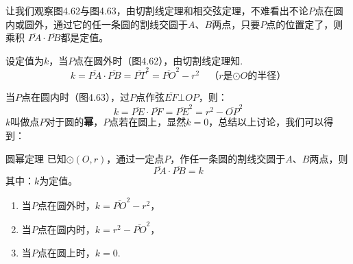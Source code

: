   \begin{figure}[htp]
    \centering
    \begin{minipage}[t]{0.48\textwidth}
    \centering
    \caption{}
    \end{minipage}
    \begin{minipage}[t]{0.48\textwidth}
    \centering
    \caption{}
    \end{minipage}
  \end{figure}
  
  让我们观察图4.62与图4.63，由切割线定理和相交弦定理，不难看出不论$P$点在圆内或圆外，通过它的任一条圆的割线交圆于$A$、$B$两点，只要$P$点的位置定了，则乘积
  $\overline{PA}\cdot \overline{PB}$都是定值。
  
  设定值为$k$，当$P$点在圆外时（图4.62），由切割线定理知.
  \[k=\overline{PA}\cdot \overline{PB}=\overline{PT}^2=\overline{PO}^2-r^2\quad \text{（$r$是$\odot O$的半径）}\]
  
  当$P$点在圆内时（图4.63），过$P$点作弦$\overline{EF}\bot OP$，则：
  \[k=\overline{PE}\cdot \overline{PF}=\overline{PE}^2=r^2-\overline{OP}^2\]
  $k$叫做点$P$对于圆的\textbf{幂}，$P$点若在圆上，显然$k=0$，总结以上讨论，我们可以得到：
  
  \begin{blk}
    {圆幂定理} 已知$\odot(O,r)$，通过一定点$P$，作任一条圆的割线交圆于$A$、$B$两点，则
   \[ \overline{PA}\cdot \overline{PB}=k\]
   其中：$k$为定值。
  \begin{enumerate}
  \item   当$P$点在圆外时，$k=\overline{PO}^2-r^2$，
  \item  当$P$点在圆内时，$k=r^2-\overline{PO}^2$，
  \item  当$P$点在圆上时，$k=0$.
  \end{enumerate}
  \end{blk}
  
